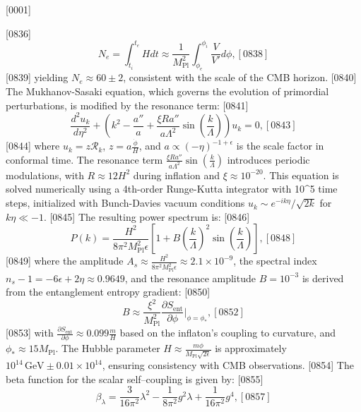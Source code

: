 [0001] \documentclass[12pt]{report}
[0002] \usepackage[utf8]{inputenc}
\begin{document}
[0836] \begin{equation}
[0837] N_e = \int_{t_i}^{t_e} H dt \approx \frac{1}{M_{\text{Pl}}^2} \int_{\phi_e}^{\phi_i} \frac{V}{V'} d\phi,
[0838] \end{equation}
[0839] yielding \(N_e \approx 60 \pm 2\), consistent with the scale of the CMB horizon.
[0840] The Mukhanov-Sasaki equation, which governs the evolution of primordial perturbations, is modified by the resonance term:
[0841] \begin{equation}
[0842] \frac{d^2 u_k}{d\eta^2} + \left( k^2 - \frac{a''}{a} + \frac{\xi R a''}{a \Lambda^2} \sin\left( \frac{k}{\Lambda} \right) \right) u_k = 0,
[0843] \end{equation}
[0844] where \(u_k = z \mathcal{R}_k\), \(z = a \frac{\dot{\phi}}{H}\), and \(a \propto (-\eta)^{-1 + \epsilon}\) is the scale factor in conformal time. The resonance term \(\frac{\xi R a''}{a \Lambda^2} \sin\left( \frac{k}{\Lambda} \right)\) introduces periodic modulations, with \(R \approx 12 H^2\) during inflation and \(\xi \approx 10^{-20}\). This equation is solved numerically using a 4th-order Runge-Kutta integrator with 10^5 time steps, initialized with Bunch-Davies vacuum conditions \(u_k \sim e^{-ik\eta}/\sqrt{2k}\) for \(k \eta \ll -1\).
[0845] The resulting power spectrum is:
[0846] \begin{equation}
[0847] P(k) = \frac{H^2}{8\pi^2 M_{\text{Pl}}^2 \epsilon} \left[ 1 + B \left( \frac{k}{\Lambda} \right)^2 \sin\left( \frac{k}{\Lambda} \right) \right],
[0848] \end{equation}
[0849] where the amplitude \(A_s \approx \frac{H^2}{8\pi^2 M_{\text{Pl}}^2 \epsilon} \approx 2.1 \times 10^{-9}\), the spectral index \(n_s - 1 = -6\epsilon + 2\eta \approx 0.9649\), and the resonance amplitude \(B = 10^{-3}\) is derived from the entanglement entropy gradient:
[0850] \begin{equation}
[0851] B \approx \frac{\xi^2}{M_{\text{Pl}}^2} \frac{\partial S_{\text{ent}}}{\partial \phi} \bigg|_{\phi = \phi_*},
[0852] \end{equation}
[0853] with \(\frac{\partial S_{\text{ent}}}{\partial \phi} \approx 0.099 \frac{m}{H}\) based on the inflaton's coupling to curvature, and \(\phi_* \approx 15 M_{\text{Pl}}\). The Hubble parameter \(H \approx \frac{m \phi}{M_{\text{Pl}} \sqrt{2\epsilon}}\) is approximately \(10^{14} \, \text{GeV} \pm 0.01 \times 10^{14}\), ensuring consistency with CMB observations.
[0854] The beta function for the scalar self–coupling is given by:
[0855] \begin{equation}
[0856] \beta_\lambda = \frac{3}{16\pi^2} \lambda^2 - \frac{1}{8\pi^2} g^2 \lambda + \frac{1}{16\pi^2} g^4,
[0857] \end{equation}
\end{document}
